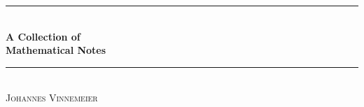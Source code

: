 \documentclass{article}
\theoremstyle{definition}
\theoremstyle{remark}
\begin{document}
    \begin{titlepage}
      \vspace*{1cm}
      \centering
      \rule{10cm}{0.2mm} \\[.5cm]
      {\LARGE\bfseries A Collection of \\[.25cm] Mathematical Notes}\\[.5cm]
      \rule{10cm}{0.2mm} \\[.4cm]
      \Large \textsc{Johannes Vinnemeier}
    \end{titlepage}

    \tableofcontents
    \newpage

    

    

    

    

    

    

    

    

    

    

    
    
    

    

    

\cleardoublepage
{}



\nocite{*} %


\end{document}
